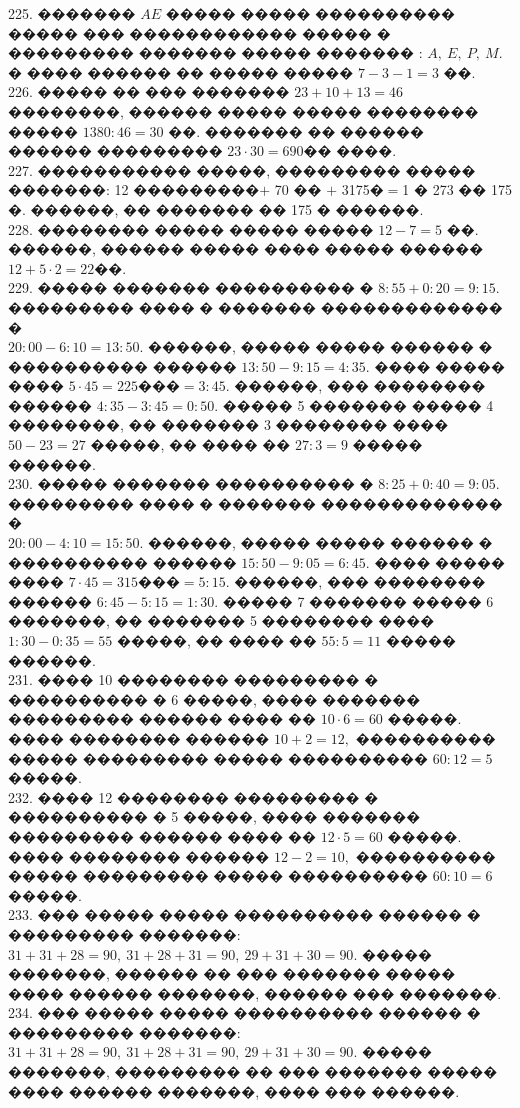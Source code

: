 \documentclass[12pt]{article}
\begin{document}
225. ������� $AE$ ����� ����� ���������� ����� ��� ������������ ����� � ��������� ������� ����� ������� : $A,\ E,\ P,\ M.$ � ���� ������ �� ����� ����� $7-3-1=3$ ��.\\
226. ����� �� ��� ������� $23+10+13=46$ ��������, ������ ����� ����� �������� ����� $1380:46=30$ ��. ������� �� ������ ������ ��������� $23\cdot30=690$�� ����.\\
227. ����������� �����, ��������� ����� �������: 12 ���������$+$ 70 �� $+$ 3175�$=$1 � 273 �� 175 �. ������, �� ������� �� 175 � ������.\\
228. �������� ����� ����� ����� $12-7=5$ ��. ������, ������ ����� ���� ����� ������ $12+5\cdot2=22$��.\\
229. ����� ������� ���������� � $8:55+0:20=9:15.$ ��������� ���� � ������� ������������� � \\ $20:00-6:10=13:50.$ ������, ����� ����� ������ � ���������� ������ $13:50-9:15=4:35.$ ���� ����� ���� $5\cdot45=225\text{���}=3:45.$ ������, ��� �������� ������ $4:35-3:45=0:50.$ ����� 5 ������� ����� 4 ��������, �� ������� 3 �������� ���� $50-23=27$ �����, �� ���� �� $27:3=9$ ����� ������.\\
230. ����� ������� ���������� � $8:25+0:40=9:05.$ ��������� ���� � ������� ������������� � \\ $20:00-4:10=15:50.$ ������, ����� ����� ������ � ���������� ������ $15:50-9:05=6:45.$ ���� ����� ���� $7\cdot45=315\text{���}=5:15.$ ������, ��� �������� ������ $6:45-5:15=1:30.$ ����� 7 ������� ����� 6 �������, �� ������� 5 �������� ���� $1:30-0:35=55$ �����, �� ���� �� $55:5=11$ ����� ������.\\
231. ���� 10 �������� ��������� � ���������� � 6 �����, ���� ������� ��������� ������ ���� �� $10\cdot6=60$ �����. ���� �������� ������ $10+2=12,$ ���������� ����� ��������� ����� ���������� $60:12=5$ �����.\\
232. ���� 12 �������� ��������� � ���������� � 5 �����, ���� ������� ��������� ������ ���� �� $12\cdot5=60$ �����. ���� �������� ������ $12-2=10,$ ���������� ����� ��������� ����� ���������� $60:10=6$ �����.\\
233. ��� ����� ����� ���������� ������ � ��������� �������: $31+31+28=90,\ 31+28+31=90,\ 29+31+30=90.$ ����� �������, ������ �� ��� ������� ����� ���� ������ �������, ������ ��� �������.\\
234. ��� ����� ����� ���������� ������ � ��������� �������: $31+31+28=90,\ 31+28+31=90,\ 29+31+30=90.$ ����� �������, ��������� �� ��� ������� ����� ���� ������ �������, ���� ��� ������.\\
\end{document}
